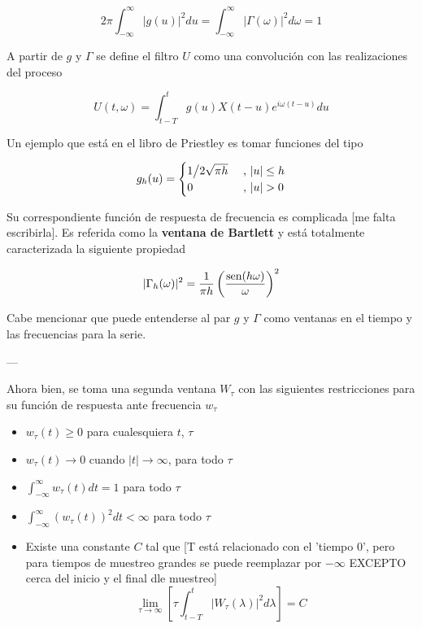 \begin{equation*}
2\pi \int_{-\infty}^{\infty} \lvert g(u) \lvert^{2} du 
= 
\int_{-\infty}^{\infty} \lvert \Gamma(\omega) \lvert^{2} d\omega
= 1
\end{equation*}


A partir de $g$ y $\Gamma$ se define el filtro $U$ como una convoluci\'on
con las realizaciones del proceso

\begin{equation*}
U(t,\omega) = \int_{t-T}^{t} g(u) X({t-u}) e^{i \omega (t-u)} du
\end{equation*}

Un ejemplo que est\'a en el libro de Priestley es tomar funciones del tipo

\begin{equation*}
g_h(u) = 
\begin{cases}
{1 \big{/} 2\sqrt{\pi h}} & \text{ , } \lvert u \rvert \leq h
\\
0 & \text{ , } \lvert u \rvert > 0
\end{cases}
\end{equation*}

Su correspondiente funci\'on de respuesta de frecuencia es complicada [me falta 
escribirla]. Es referida como la \textbf{ventana de Bartlett} y
est\'a totalmente caracterizada la siguiente propiedad

\begin{equation*}
\lvert \Gamma_h(\omega) \rvert^{2} = \frac{1}{\pi h} \left( \frac{\text{sen} (h \omega)}{\omega} \right)^{2}
\end{equation*}

Cabe mencionar que puede entenderse al par $g$ y $\Gamma$ como ventanas en el tiempo
y las frecuencias para la serie.

---

Ahora bien, se toma una segunda ventana $W_\tau$ con las siguientes
restricciones para
su funci\'on de respuesta ante frecuencia $w_\tau$

\begin{itemize}
\item $w_{\tau}(t) \geq 0$ para cualesquiera $t$, $\tau$
\item $w_{\tau}(t) \rightarrow 0$ cuando $\lvert t \lvert \rightarrow \infty$, para todo $\tau$
\item $\displaystyle \int_{-\infty}^{\infty} w_{\tau}(t) dt = 1$ para todo $\tau$
\item $\displaystyle \int_{-\infty}^{\infty} \left( w_{\tau}(t) \right)^{2} dt < \infty$ para todo $\tau$
\item Existe una constante $C$ tal que  [T est\'a relacionado con el 'tiempo 0', pero para
tiempos de muestreo grandes se puede reemplazar por $-\infty$ EXCEPTO cerca del inicio y el final dle muestreo]
$$\lim_{\tau\rightarrow\infty} \left[ \tau \int_{t-T}^{t} \lvert W_{\tau}(\lambda) \lvert^{2} d\lambda \right] = C$$
\end{itemize}

